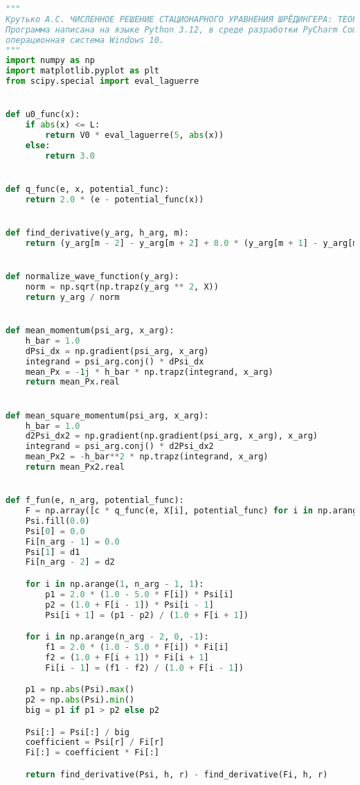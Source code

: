\begin{lstlisting}[language=Python, caption=Код файла solver.py,label={lst:solver}]
"""
Крутько А.С. ЧИСЛЕННОЕ РЕШЕНИЕ СТАЦИОНАРНОГО УРАВНЕНИЯ ШРЁДИНГЕРА: ТЕОРИЯ ВОЗМУЩЕНИЙ.
Программа написана на языке Python 3.12, в среде разработки PyCharm Community Edition 2024.3.1,
операционная система Windows 10.
"""
import numpy as np
import matplotlib.pyplot as plt
from scipy.special import eval_laguerre


def u0_func(x):
    if abs(x) <= L:
        return V0 * eval_laguerre(5, abs(x))
    else:
        return 3.0


def q_func(e, x, potential_func):
    return 2.0 * (e - potential_func(x))


def find_derivative(y_arg, h_arg, m):
    return (y_arg[m - 2] - y_arg[m + 2] + 8.0 * (y_arg[m + 1] - y_arg[m - 1])) / (12.0 * h_arg)


def normalize_wave_function(y_arg):
    norm = np.sqrt(np.trapz(y_arg ** 2, X))
    return y_arg / norm


def mean_momentum(psi_arg, x_arg):
    h_bar = 1.0
    dPsi_dx = np.gradient(psi_arg, x_arg)
    integrand = psi_arg.conj() * dPsi_dx
    mean_Px = -1j * h_bar * np.trapz(integrand, x_arg)
    return mean_Px.real


def mean_square_momentum(psi_arg, x_arg):
    h_bar = 1.0
    d2Psi_dx2 = np.gradient(np.gradient(psi_arg, x_arg), x_arg)
    integrand = psi_arg.conj() * d2Psi_dx2
    mean_Px2 = -h_bar**2 * np.trapz(integrand, x_arg)
    return mean_Px2.real


def f_fun(e, n_arg, potential_func):
    F = np.array([c * q_func(e, X[i], potential_func) for i in np.arange(n_arg)])
    Psi.fill(0.0)
    Psi[0] = 0.0
    Fi[n_arg - 1] = 0.0
    Psi[1] = d1
    Fi[n_arg - 2] = d2

    for i in np.arange(1, n_arg - 1, 1):
        p1 = 2.0 * (1.0 - 5.0 * F[i]) * Psi[i]
        p2 = (1.0 + F[i - 1]) * Psi[i - 1]
        Psi[i + 1] = (p1 - p2) / (1.0 + F[i + 1])

    for i in np.arange(n_arg - 2, 0, -1):
        f1 = 2.0 * (1.0 - 5.0 * F[i]) * Fi[i]
        f2 = (1.0 + F[i + 1]) * Fi[i + 1]
        Fi[i - 1] = (f1 - f2) / (1.0 + F[i - 1])

    p1 = np.abs(Psi).max()
    p2 = np.abs(Psi).min()
    big = p1 if p1 > p2 else p2

    Psi[:] = Psi[:] / big
    coefficient = Psi[r] / Fi[r]
    Fi[:] = coefficient * Fi[:]

    return find_derivative(Psi, h, r) - find_derivative(Fi, h, r)



\end{lstlisting}
